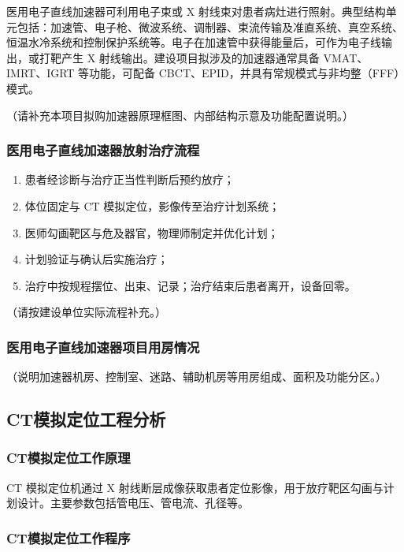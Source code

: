 医用电子直线加速器可利用电子束或 X 射线束对患者病灶进行照射。典型结构单元包括：加速管、电子枪、微波系统、调制器、束流传输及准直系统、真空系统、恒温水冷系统和控制保护系统等。电子在加速管中获得能量后，可作为电子线输出，或打靶产生 X 射线输出。建设项目拟涉及的加速器通常具备 VMAT、IMRT、IGRT 等功能，可配备 CBCT、EPID，并具有常规模式与非均整（FFF）模式。

（请补充本项目拟购加速器原理框图、内部结构示意及功能配置说明。）

\subsubsection{医用电子直线加速器放射治疗流程}

\begin{enumerate}
\item 患者经诊断与治疗正当性判断后预约放疗；
\item 体位固定与 CT 模拟定位，影像传至治疗计划系统；
\item 医师勾画靶区与危及器官，物理师制定并优化计划；
\item 计划验证与确认后实施治疗；
\item 治疗中按规程摆位、出束、记录；治疗结束后患者离开，设备回零。
\end{enumerate}

（请按建设单位实际流程补充。）

\subsubsection{医用电子直线加速器项目用房情况}

（说明加速器机房、控制室、迷路、辅助机房等用房组成、面积及功能分区。）

\subsection{CT模拟定位工程分析}

\subsubsection{CT模拟定位工作原理}

CT 模拟定位机通过 X 射线断层成像获取患者定位影像，用于放疗靶区勾画与计划设计。主要参数包括管电压、管电流、孔径等。

\subsubsection{CT模拟定位工作程序}

